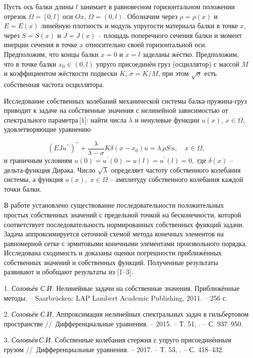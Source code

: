 




\vzmscaption


Пусть ось балки длины $l$
занимает в равновесном горизонтальном положении отрезок $\overline{\Omega}=[0,l]$
оси $Ox$, $\Omega=(0,l)$. Обозначим через $\rho=\rho(x)$ и $E=E(x)$ линейную плотность и
модуль упругости материала балки в точке $x$,
через $S=S(x)$ и $J=J(x)$ -- площадь поперечного сечения балки и момент
инерции сечения в точке $x$ относительно своей горизонтальной оси.
Предположим, что концы балки $x=0$ и $x=l$ заделаны жёстко.
Предположим,
что в точке балки
$x_0\in(0,l)$ упруго присоединён груз (осциллятор) с массой $M$  и
коэффициентом жёсткости подвески $K$,
$\sigma=K/M$,
при этом
$\sqrt{\sigma}$ есть собственная частота осциллятора.

Исследование собственных колебаний механической системы балка-пружина-груз приводит к
задаче на собственные значения с нелинейной зависимостью от спектрального параметра\,[1]:
найти числа $\lambda$ и ненулевые функции $u(x)$, $x\in\Omega$,
удовлетворяющие уравнению

$$
(EJu^{\prime\prime})^{\prime\prime}+
\frac{\lambda}{\lambda-\sigma}
K\delta(x-x_0)u=
\lambda\,\rho S\,u,\quad
x\in\Omega,
$$
и граничным условиям
$
u(0)=u^{\prime}(0)=u(l)=u^{\prime}(l)=0,
$
где $\delta(x)$ -- дельта-функция Дирака.
Число $\sqrt{\lambda}$ определяет частоту собственного колебания системы, а функция
$u(x),$ $x\in\overline{\Omega}$ -- амплитуду собственного колебания каждой точки балки.

В работе установлено существование последовательности положительных
простых собственных значений с предельной точкой
на бесконечности, которой соответствует последовательность нормированных собственных функций задачи.
Задача аппроксимируется сеточной схемой метода конечных
элементов на равномерной сетке с эрмитовыми конечными элементами произвольного порядка.
Исследована сходимость и доказаны оценки погрешности приближённых
собственных значений и собственных функций.
Полученные результаты развивают и обобщают результаты из [1--3].




\litlist

1. {\it Соловьёв С.И.}
Нелинейные задачи на собственные значения. Приближённые методы. --
Saarbr\"ucken: LAP Lambert Academic Publishing, 2011. -- 256 с.

2. {\it Соловьёв С.И.}
Аппроксимация нелинейных спектральных задач в гильбертовом пространстве
//~Дифференциальные уравнения. -- 2015. -- Т. 51,
. -- С. 937--950.

3. {\it Соловьёв\,С.И.}
Собственные колебания стержня с упруго присоединённым грузом
//~Дифференциальные уравнения. -- 2017. -- Т. 53,
. -- С. 418--432.

